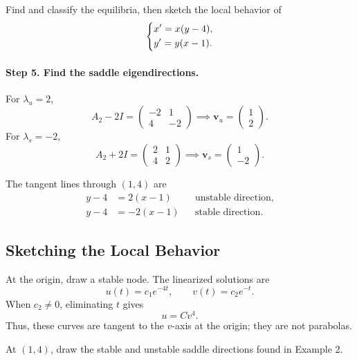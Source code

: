 \documentclass[10pt,letterpaper]{article}
\begin{document}
\begin{example}[2]{
Find and classify the equilibria, then sketch the
local behavior of
\[
\begin{dcases}
x'=x(y-4),\\
y'=y(x-1).
\end{dcases}
\]
}
\paragraph{Step 5. Find the saddle eigendirections.}
For $\lambda_u=2$,
\[
A_2-2I=
\begin{pmatrix}
-2&1\\
4&-2
\end{pmatrix}
\implies
\mathbf{v}_u=\begin{pmatrix}1\\2\end{pmatrix}.
\]
For $\lambda_s=-2$,
\[
A_2+2I=
\begin{pmatrix}
2&1\\
4&2
\end{pmatrix}
\implies
\mathbf{v}_s=\begin{pmatrix}1\\-2\end{pmatrix}.
\]

The tangent lines through $(1,4)$ are
\[
\begin{aligned}
y-4&=2(x-1)
&&\text{unstable direction},\\
y-4&=-2(x-1)
&&\text{stable direction}.
\end{aligned}
\]
\end{example}

\subsection{Sketching the Local Behavior}

At the origin, draw a stable node. The linearized
solutions are
\[
u(t)=c_1e^{-4t},
\qquad
v(t)=c_2e^{-t}.
\]
When $c_2\ne0$, eliminating $t$ gives
\[
u=Cv^4.
\]
Thus, these curves are tangent to the $v$-axis
at the origin; they are not parabolas.

At $(1,4)$, draw the stable and unstable saddle
directions found in Example 2.
\end{document}
